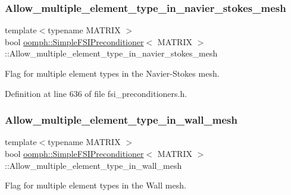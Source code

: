 \subsubsection{\texorpdfstring{Allow\+\_\+multiple\+\_\+element\+\_\+type\+\_\+in\+\_\+navier\+\_\+stokes\+\_\+mesh}{Allow\_multiple\_element\_type\_in\_navier\_stokes\_mesh}}
{\footnotesize\ttfamily template$<$typename M\+A\+T\+R\+IX $>$ \\
bool \hyperlink{classoomph_1_1SimpleFSIPreconditioner}{oomph\+::\+Simple\+F\+S\+I\+Preconditioner}$<$ M\+A\+T\+R\+IX $>$\+::Allow\+\_\+multiple\+\_\+element\+\_\+type\+\_\+in\+\_\+navier\+\_\+stokes\+\_\+mesh\hspace{0.3cm}{\ttfamily [private]}}



Flag for multiple element types in the Navier-\/\+Stokes mesh. 



Definition at line 636 of file fsi\+\_\+preconditioners.\+h.

\mbox{\label{classoomph_1_1SimpleFSIPreconditioner_a70094cbfae8c30e11647906cdd7e38c3}} 
\subsubsection{\texorpdfstring{Allow\+\_\+multiple\+\_\+element\+\_\+type\+\_\+in\+\_\+wall\+\_\+mesh}{Allow\_multiple\_element\_type\_in\_wall\_mesh}}
{\footnotesize\ttfamily template$<$typename M\+A\+T\+R\+IX $>$ \\
bool \hyperlink{classoomph_1_1SimpleFSIPreconditioner}{oomph\+::\+Simple\+F\+S\+I\+Preconditioner}$<$ M\+A\+T\+R\+IX $>$\+::Allow\+\_\+multiple\+\_\+element\+\_\+type\+\_\+in\+\_\+wall\+\_\+mesh\hspace{0.3cm}{\ttfamily [private]}}



Flag for multiple element types in the Wall mesh. 



